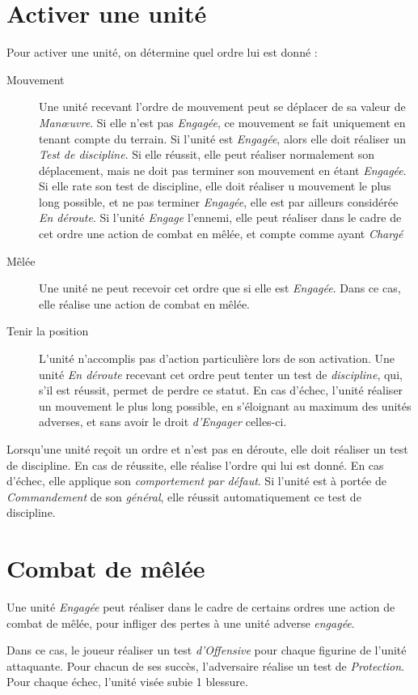\documentclass[10pt,a4paper]{book}
\begin{document}
\section{Activer une unité}
Pour activer une unité, on détermine quel ordre lui est donné :
\begin{description}
\item[Mouvement] Une unité recevant l'ordre de mouvement peut se déplacer de sa valeur de \emph{Manœuvre}. Si elle n'est pas \emph{Engagée}, ce mouvement se fait uniquement en tenant compte du terrain. Si l'unité est \emph{Engagée}, alors elle doit réaliser un \emph{Test de discipline}. Si elle réussit, elle peut réaliser normalement son déplacement, mais ne doit pas terminer son mouvement en étant \emph{Engagée}. Si elle rate son test de discipline, elle doit réaliser u mouvement le plus long possible, et ne pas terminer \emph{Engagée}, elle est par ailleurs considérée \emph{En déroute}. Si l'unité \emph{Engage} l'ennemi, elle peut réaliser dans le cadre de cet ordre une action de combat en mêlée, et compte comme ayant \emph{Chargé}
\item[Mêlée] Une unité ne peut recevoir cet ordre que si elle est \emph{Engagée}. Dans ce cas, elle réalise une action de combat en mêlée.
\item[Tenir la position]L'unité n'accomplis pas d'action particulière lors de son activation. Une unité \emph{En déroute} recevant cet ordre peut tenter un test de \emph{discipline}, qui, s'il est réussit, permet de perdre ce statut. En cas d'échec, l'unité réaliser un mouvement le plus long possible, en s'éloignant au maximum des unités adverses, et sans avoir le droit \emph{d'Engager} celles-ci.
\end{description}

Lorsqu'une unité reçoit un ordre et n'est pas en déroute, elle doit réaliser un test de discipline. En cas de réussite, elle réalise l'ordre qui lui est donné. En cas d'échec, elle applique son \emph{comportement par défaut}. Si l'unité est à portée de \emph{Commandement} de son \emph{général}, elle réussit automatiquement ce test de discipline.


\section{Combat de mêlée}
Une unité \emph{Engagée} peut réaliser dans le cadre de certains ordres une action de combat de mêlée, pour infliger des pertes à une unité adverse \emph{engagée}.

Dans ce cas, le joueur réaliser un test \emph{d'Offensive} pour chaque figurine de l'unité attaquante. Pour chacun de ses succès, l'adversaire réalise un test de \emph{Protection}. Pour chaque échec, l'unité visée subie 1 blessure.
\end{document}
